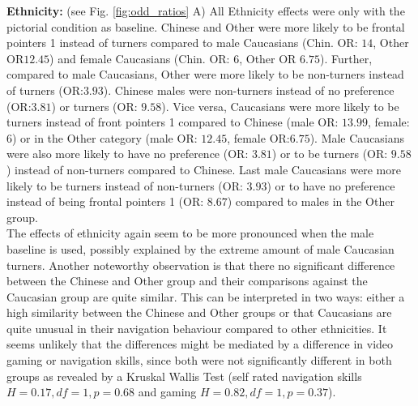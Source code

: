 \documentclass{frontiersSCNS} %
\begin{document}
\textbf{Ethnicity:} (see Fig. \ref{fig:odd_ratios} A)
All Ethnicity effects were only with the pictorial condition as baseline. Chinese and Other were more likely to be frontal pointers 1 instead of turners compared to male Caucasians (Chin. OR: $14$, Other OR$12.45$) and female Caucasians (Chin. OR: $6$, Other OR $6.75$). Further, compared to male Caucasians, Other were more likely to be non-turners instead of turners (OR:$3.93$). Chinese males were non-turners instead of no preference (OR:$3.81$) or turners (OR: $9.58$). Vice versa, Caucasians were more likely to be turners instead of front pointers 1 compared to Chinese (male OR: $13.99$, female: $6$) or in the Other category (male OR: $12.45$, female OR:$6.75$). Male Caucasians were also more likely to have no preference (OR: $3.81$) or to be turners (OR: $9.58$) instead of non-turners compared to Chinese. Last male Caucasians were more likely to be turners instead of non-turners (OR: $3.93$) or to have no preference instead of being frontal pointers 1 (OR: $8.67$) compared to males in the Other group.\\
The effects of ethnicity again seem to be more pronounced when the male baseline is used, possibly explained by the extreme amount of male Caucasian turners. Another noteworthy observation is that there no significant difference between the Chinese and Other group and their comparisons against the Caucasian group are quite similar. This can be interpreted in two ways: either a high similarity between the Chinese and Other groups or that Caucasians are quite unusual in their navigation behaviour compared to other ethnicities. It seems unlikely that the differences might be mediated by a difference in video gaming or navigation skills, since both were not significantly different in both groups as revealed by a Kruskal Wallis Test (self rated navigation skills $H=0.17, df=1, p = 0.68$ and gaming $H=0.82, df=1, p=0.37$).\\
\end{document}
